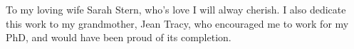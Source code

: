 To my loving wife Sarah Stern, who's love I will alway cherish.
I also dedicate this work to my grandmother, Jean Tracy, who encouraged me to work for my PhD, and would have been proud of its completion.
